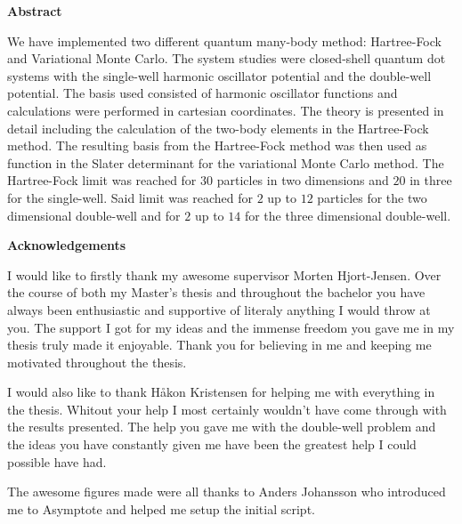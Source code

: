 \begin{center}
    \textbf{\Large{Abstract}}\\ \vspace{0.6cm}
\end{center}
    We have implemented two different quantum many-body method: Hartree-Fock
    and Variational Monte Carlo. The system studies were closed-shell quantum
    dot systems with the single-well harmonic oscillator potential and the
    double-well potential. The basis used consisted of harmonic oscillator
    functions and calculations were performed in cartesian coordinates. The
    theory is presented in detail including the calculation of the two-body
    elements in the Hartree-Fock method. The resulting basis from the
    Hartree-Fock method was then used as function in the Slater determinant for
    the variational Monte Carlo method. The Hartree-Fock limit was reached for
    $30$ particles in two dimensions and $20$ in three for the single-well.
    Said limit was reached for $2$ up to $12$ particles for the two dimensional
    double-well and for $2$ up to $14$ for the three dimensional double-well.

\thispagestyle{empty}
\clearpage

\thispagestyle{empty}
\clearpage

\begin{center}
    \textbf{\Large{Acknowledgements}}\\ \vspace{0.6cm}
\end{center}
    I would like to firstly thank my awesome supervisor Morten Hjort-Jensen.
    Over the course of both my Master's thesis and throughout the bachelor you
    have always been enthusiastic and supportive of literaly anything I would
    throw at you. The support I got for my ideas and the immense freedom you
    gave me in my thesis truly made it enjoyable. Thank you for believing in me
    and keeping me motivated throughout the thesis.

    I would also like to thank Håkon Kristensen for helping me with everything
    in the thesis. Whitout your help I most certainly wouldn't have come
    through with the results presented. The help you gave me with the
    double-well problem and the ideas you have constantly given me have been
    the greatest help I could possible have had.

    The awesome figures made were all thanks to Anders Johansson who introduced
    me to Asymptote and helped me setup the initial script.

